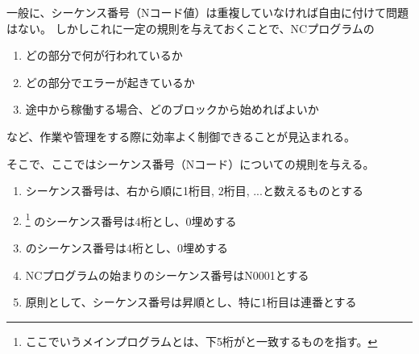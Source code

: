 

一般に、シーケンス番号（Nコード値）は重複していなければ自由に付けて問題はない。
しかしこれに一定の規則を与えておくことで、NCプログラムの
\begin{enumerate}[label=\sarrow]
\item どの部分で何が行われているか
\item どの部分でエラーが起きているか
\item 途中から稼働する場合、どのブロックから始めればよいか
\end{enumerate}
など、作業や管理をする際に効率よく制御できることが見込まれる。

そこで、ここではシーケンス番号（Nコード）についての規則を与える。



\begin{enumerate}[label=\Roman*), ref=\Roman*)]
\item {}シーケンス番号は、右から順に1桁目, 2桁目, ...と数えるものとする
\item {}\nameCreatedNCMainPrg%
\footnote{ここでいうメインプログラムとは、下5桁が\DrawingNumber と一致するものを指す。}%
のシーケンス番号は4桁とし、0埋めする
\item {}\nameCreatedNCSubPrg のシーケンス番号は4桁とし、0埋めする
\item {}NCプログラムの始まりのシーケンス番号は{\ttfamily N0001}とする
\item 原則として、シーケンス番号は昇順とし、特に1桁目は連番とする
\end{enumerate}


